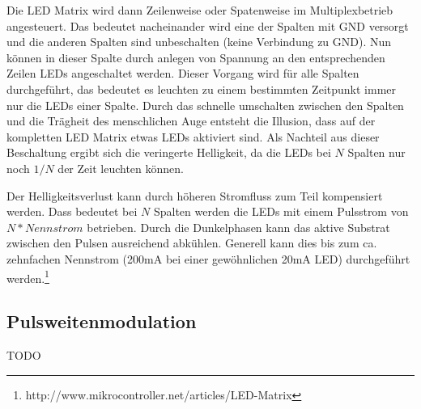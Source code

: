 Die LED Matrix
wird dann Zeilenweise oder Spatenweise im Multiplexbetrieb angesteuert. Das bedeutet nacheinander wird eine der Spalten mit GND versorgt und die anderen Spalten sind unbeschalten (keine Verbindung zu GND). Nun können in dieser Spalte durch anlegen von Spannung an den entsprechenden Zeilen LEDs angeschaltet werden. 
Dieser Vorgang wird für alle Spalten durchgeführt, das bedeutet es leuchten zu
einem bestimmten Zeitpunkt immer nur die LEDs einer Spalte. Durch das schnelle
umschalten zwischen den Spalten und die Trägheit des menschlichen Auge entsteht
die Illusion, dass auf der kompletten LED Matrix etwas LEDs aktiviert sind.
Als Nachteil aus dieser Beschaltung ergibt sich die veringerte Helligkeit, da
die LEDs bei $N$ Spalten nur noch $1/N$ der Zeit leuchten können.

Der Helligkeitsverlust kann durch höheren Stromfluss zum Teil kompensiert
werden. Dass bedeutet bei $N$ Spalten werden die LEDs mit einem Pulsstrom von
$N*Nennstrom$ betrieben. Durch die Dunkelphasen kann das aktive Substrat
zwischen den Pulsen ausreichend abkühlen. Generell kann dies bis zum ca.
zehnfachen Nennstrom (200mA bei einer gewöhnlichen 20mA LED) durchgeführt
werden.\footnote{http://www.mikrocontroller.net/articles/LED-Matrix}




\subsection{Pulsweitenmodulation}\label{sec_pulsweitenmodulation}
TODO
